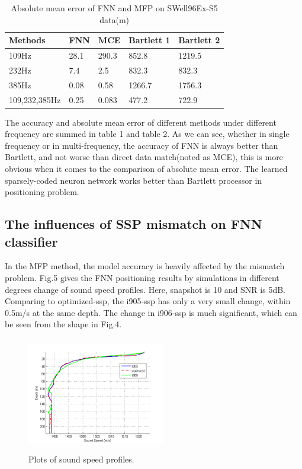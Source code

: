 \begin{table}[]
\caption{Absolute mean error of FNN and MFP on SWell96Ex-S5 data(m)}
\label{my-label}
\begin{tabular}{@{}lllll@{}}
\toprule
Methods       & FNN  & MCE   & Bartlett 1 & Bartlett 2 \\ \midrule
109Hz         & 28.1 & 290.3 & 852.8      & 1219.5     \\
232Hz         & 7.4  & 2.5   & 832.3      & 832.3      \\
385Hz         & 0.08 & 0.58  & 1266.7     & 1756.3     \\
109,232,385Hz & 0.25 & 0.083 & 477.2      & 722.9      \\ \bottomrule
\end{tabular}
\end{table}

The accuracy and absolute mean error of different methods under different frequency are summed in table 1 and table 2. As we can see, whether in single frequency or in multi-frequency, the accuracy of FNN is always better than Bartlett, and not worse than direct data match(noted as MCE), this is more obvious when it comes to the comparison of absolute mean error.
The learned sparsely-coded neuron network works better than Bartlett processor in positioning problem.

\subsection{The influences of SSP mismatch on FNN classifier}
In the MFP method, the model accuracy is heavily affected by the mismatch problem\cite{tolstoy1989sensitivity,feuillade1989environmental,del1988effects}. Fig.5 gives the FNN positioning results by simulations in different degrees change of sound speed profiles. Here, snapshot is 10 and SNR is 5dB.
Comparing to optimized-ssp, the i905-ssp has only a very small change, within 0.5m/s at the same depth. The change in i906-ssp is much significant, which can be seen from the shape in Fig.4.
\begin{figure}
\includegraphics[width=6cm,height=5cm]{figure/ssp3}
\caption{Plots of sound speed profiles.}
\end{figure}


